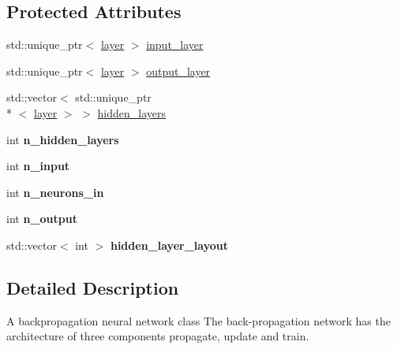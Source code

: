 \subsection*{Protected Attributes}
\begin{DoxyCompactItemize}
\item 
std\-::unique\-\_\-ptr$<$ \hyperlink{structlayer}{layer} $>$ \hyperlink{classbpnet_aeb161ecafe664d9f6e0d188b94c778f4}{input\-\_\-layer}
\item 
std\-::unique\-\_\-ptr$<$ \hyperlink{structlayer}{layer} $>$ \hyperlink{classbpnet_afc882a791c00244a5b5f0ff8badcbc1e}{output\-\_\-layer}
\item 
std\-::vector$<$ std\-::unique\-\_\-ptr\\*
$<$ \hyperlink{structlayer}{layer} $>$ $>$ \hyperlink{classbpnet_a9f1d31d7cdb034587768016a799c36f6}{hidden\-\_\-layers}
\item 
\hypertarget{classbpnet_aa4e55fef61fe2886ea6d860a1e4d63f4}{int {\bfseries n\-\_\-hidden\-\_\-layers}}\label{classbpnet_aa4e55fef61fe2886ea6d860a1e4d63f4}

\item 
\hypertarget{classbpnet_afa95293a45b21300a96d762f69232e2d}{int {\bfseries n\-\_\-input}}\label{classbpnet_afa95293a45b21300a96d762f69232e2d}

\item 
\hypertarget{classbpnet_a30a2996bef81fa705499d4f0d13574a7}{int {\bfseries n\-\_\-neurons\-\_\-in}}\label{classbpnet_a30a2996bef81fa705499d4f0d13574a7}

\item 
\hypertarget{classbpnet_a946bc26b407b7c75dc2b3ce58ed99e21}{int {\bfseries n\-\_\-output}}\label{classbpnet_a946bc26b407b7c75dc2b3ce58ed99e21}

\item 
\hypertarget{classbpnet_a9bb6a37050d988b4dda40d903c573ab0}{std\-::vector$<$ int $>$ {\bfseries hidden\-\_\-layer\-\_\-layout}}\label{classbpnet_a9bb6a37050d988b4dda40d903c573ab0}

\end{DoxyCompactItemize}


\subsection{Detailed Description}
A backpropagation neural network class The back-\/propagation network has the architecture of three components propagate, update and train. 

